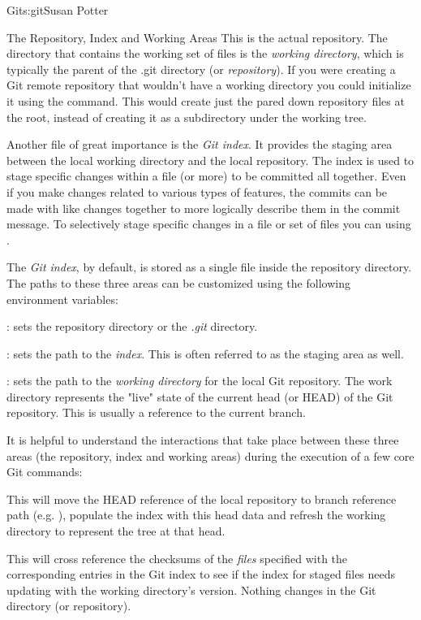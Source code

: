 \begin{aosachapter}{Git}{s:git}{Susan Potter}
\begin{aosasect1}{The Repository, Index and Working Areas}
This is the actual repository. The directory that contains the working set
of files is the \emph{working directory}, which is typically the parent of
the .git directory (or \emph{repository}). If you were creating a Git
remote repository that wouldn't have a working directory you could
initialize it using the  command. This would create
just the pared down repository files at the root, instead of creating it
as a subdirectory under the working tree.

Another file of great importance is the \emph{Git index}. It provides the
staging area between the local working directory and the local repository.
The index is used to stage specific changes within a file (or more) to
be committed all together. Even if you make changes related to various types
of features, the commits can be made with like changes together to more
logically describe them in the commit message. To selectively stage
specific changes in a file or set of files you can using .

The \emph{Git index}, by default, is stored as a single file inside the
repository directory. The paths to these three areas can be customized
using the following environment variables:
\begin{aosaitemize}
  \item {}: sets the repository directory or the \emph{.git}
  directory.
  \item {}: sets the path to the \emph{index}. This is often
  referred to as the staging area as well.
  \item {}: sets the path to the \emph{working directory}
  for the local Git repository. The work directory represents the "live"
  state of the current head (or HEAD) of the Git repository. This is usually
  a reference to the current branch.
\end{aosaitemize}

It is helpful to understand the interactions that take place between these
three areas (the repository, index and working areas) during the execution
of a few core Git commands:

\begin{aosaitemize}
  \item {} \newline
  \small{This will move the HEAD reference of the local repository to branch
  reference path (e.g. ), populate the index with
  this head data and refresh the working directory to represent the tree
  at that head.}
  \item {} \newline
  \small{This will cross reference the checksums of the \emph{files}
  specified with the corresponding entries in the Git index to see if the
  index for staged files needs updating with the working directory's
  version. Nothing changes in the Git directory (or repository).}
\end{aosaitemize}


\end{aosasect1}
\end{aosachapter}
